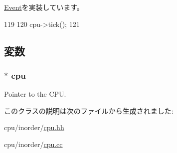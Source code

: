 \hyperlink{classEvent_a142b75b68a6291400e20fb0dd905b1c8}{Event}を実装しています。


\begin{DoxyCode}
119 {
120     cpu->tick();
121 }
\end{DoxyCode}


\subsection{変数}
\hypertarget{classInOrderCPU_1_1TickEvent_a41d682c28d0f49e04393c52815808782}{
\subsubsection[{cpu}]{$\ast$ {\bf cpu}}}
\label{classInOrderCPU_1_1TickEvent_a41d682c28d0f49e04393c52815808782}
Pointer to the CPU. 

このクラスの説明は次のファイルから生成されました:\begin{DoxyCompactItemize}
\item 
cpu/inorder/\hyperlink{inorder_2cpu_8hh}{cpu.hh}\item 
cpu/inorder/\hyperlink{inorder_2cpu_8cc}{cpu.cc}\end{DoxyCompactItemize}
